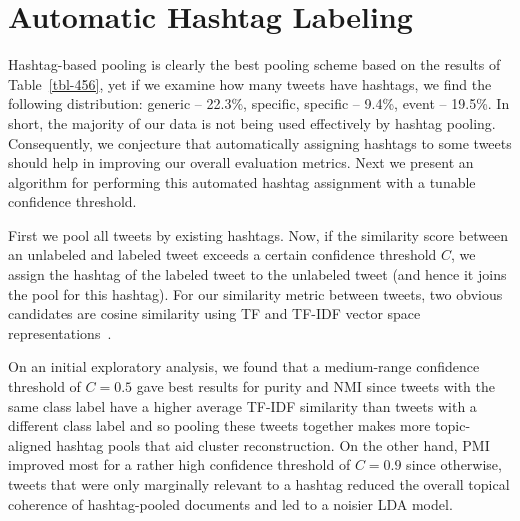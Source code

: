 \documentclass{sig-alternate}
\begin{document}

\section{Automatic Hashtag Labeling}

Hashtag-based pooling is clearly the best pooling scheme based on the
results of Table~\ref{tbl-456}, yet if we examine how many tweets have
hashtags, we find the following distribution: generic -- 22.3\%,
specific, specific -- 9.4\%, event -- 19.5\%.  In short, the majority
of our data is not being used effectively by hashtag pooling.
Consequently, we conjecture that automatically assigning hashtags to
some tweets should help in improving our overall evaluation metrics.
Next we present an algorithm for performing this automated hashtag
assignment with a tunable confidence threshold.

\vspace{1mm}  First we pool
all tweets by existing hashtags.  Now, if the similarity score between
an unlabeled and labeled tweet exceeds a certain confidence threshold
$C$, we assign the hashtag of the labeled tweet to the unlabeled tweet
(and hence it joins the pool for this hashtag).  For our similarity
metric between tweets, two obvious candidates are cosine similarity
using TF and TF-IDF vector space representations~\cite{salton83Introduction}.  

On an initial exploratory analysis, we found that a medium-range
confidence threshold of $C=0.5$ gave best results for purity and NMI
since tweets with the same class label have a higher average TF-IDF
similarity than tweets with a different class label and so pooling
these tweets together makes more topic-aligned hashtag pools that aid
cluster reconstruction.  On the other hand, PMI improved most for a
rather high confidence threshold of $C=0.9$ since otherwise, tweets
that were only marginally relevant to a hashtag reduced the overall
topical coherence of hashtag-pooled documents and led to a noisier LDA
model.
\end{document}
